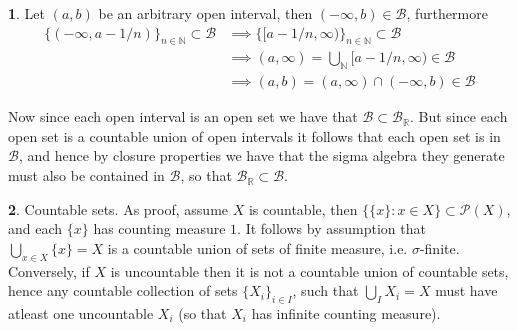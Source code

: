 \documentclass[10.5pt]{article}
\theoremstyle{definition}
\newtheorem{pb}{}
\newcommand{\set}[1]{\{#1\}}
\begin{document}
	\begin{pb}
		Let \((a,b)\) be an arbitrary open interval, then \((-\infty,b) \in \mathcal{B}\), furthermore
		\begin{align*}
			\set{(-\infty, a - 1/n)}_{n \in \mathbb{N}} \subset \mathcal{B} &\implies \set{[a - 1/n, \infty)}_{n \in \mathbb{N}} \subset \mathcal{B} \\
			&\implies (a,\infty) = \bigcup_{\mathbb{N}} [a-1/n,\infty) \in \mathcal{B} \\
			&\implies (a,b) = (a,\infty) \cap (-\infty, b) \in \mathcal{B}
		\end{align*}

		Now since each open interval is an open set we have that \(\mathcal{B} \subset \mathcal{B}_\mathbb{R}\). But since each open set is a countable union
		of open intervals it follows that each open set is in \(\mathcal{B}\), and hence by closure properties we have that
		the sigma algebra they generate must also be contained in \(\mathcal{B}\), so that \(\mathcal{B}_\mathbb{R} \subset \mathcal{B}\).
	\end{pb}

	\begin{pb}
		Countable sets. As proof, assume \(X\) is countable, then \(\set{\set{x}: x \in X} \subset \mathcal{P}(X)\), and each \(\set{x}\) has counting measure \(1\).
		It follows by assumption that \(\bigcup_{x\in X}\set{x} = X\) is a countable union of sets of finite measure, i.e. \(\sigma\)-finite.
		Conversely, if \(X\) is uncountable then it is not a countable union of countable sets, hence any countable collection of sets
		\(\set{X_i}_{i \in I}\), such that \(\bigcup_I X_i = X\) must have atleast one uncountable \(X_i\) (so that \(X_i\) has infinite counting measure).
	\end{pb}
\end{document}
